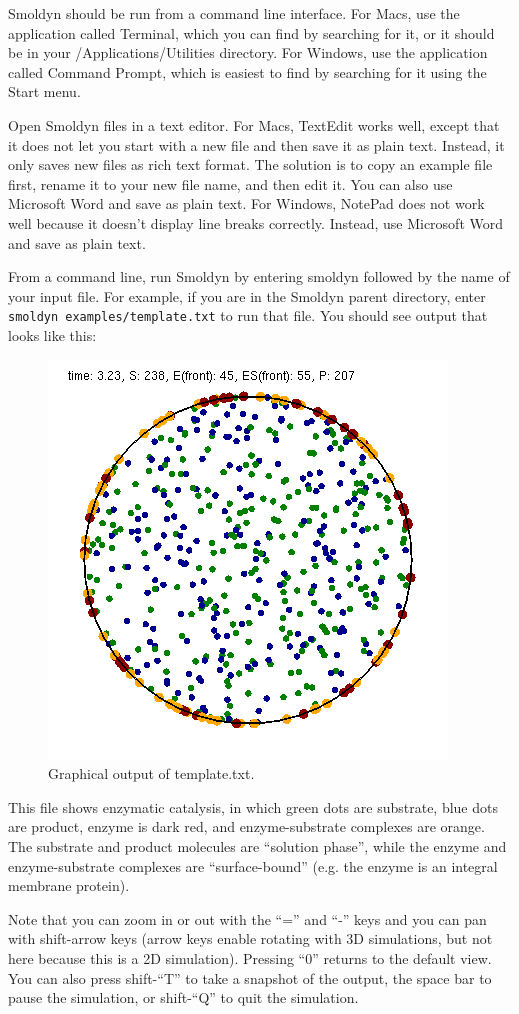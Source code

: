 \documentclass {book}
\newcommand {\ttt} {\texttt}
\begin{document}
Smoldyn should be run from a command line interface. For Macs, use the application called Terminal, which you can find by searching for it, or it should be in your /Applications/Utilities directory. For Windows, use the application called Command Prompt, which is easiest to find by searching for it using the Start menu.

Open Smoldyn files in a text editor. For Macs, TextEdit works well, except that it does not let you start with a new file and then save it as plain text. Instead, it only saves new files as rich text format. The solution is to copy an example file first, rename it to your new file name, and then edit it. You can also use Microsoft Word and save as plain text. For Windows, NotePad does not work well because it doesn't display line breaks correctly. Instead, use Microsoft Word and save as plain text.

From a command line, run Smoldyn by entering smoldyn followed by the name of your input file. For example, if you are in the Smoldyn parent directory, enter  \ttt{smoldyn examples/template.txt} to run that file. You should see output that looks like this:

\begin{figure}[h]
\centering
\includegraphics[height=5 cm]{figures/image1}
\caption{Graphical output of template.txt.}
\label{fig:template}
\end{figure}

This file shows enzymatic catalysis, in which green dots are substrate, blue dots are product, enzyme is dark red, and enzyme-substrate complexes are orange. The substrate and product molecules are ``solution phase'', while the enzyme and enzyme-substrate complexes are ``surface-bound'' (e.g. the enzyme is an integral membrane protein).

Note that you can zoom in or out with the ``='' and ``-'' keys and you can pan with shift-arrow keys (arrow keys enable rotating with 3D simulations, but not here because this is a 2D simulation). Pressing ``0'' returns to the default view. You can also press shift-``T'' to take a snapshot of the output, the space bar to pause the simulation, or shift-``Q'' to quit the simulation.
\end{document}

